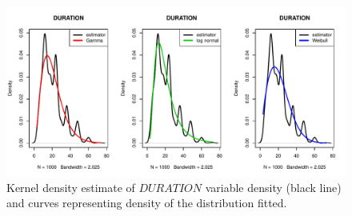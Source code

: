 \documentclass[10pt]{article}\usepackage[]{graphicx}\usepackage[]{color}
\newenvironment{knitrout}{}{} %
\begin{document}
\begin{figure}[h!]
\centering
\begin{knitrout}
\color{fgcolor}
\includegraphics[width=.95\linewidth]{figure/unnamed-chunk-3-1} 

\end{knitrout}
\caption{Kernel density estimate of $DURATION$ variable density (black line) and curves representing density of the distribution fitted.}
\end{figure}
\end{document}
